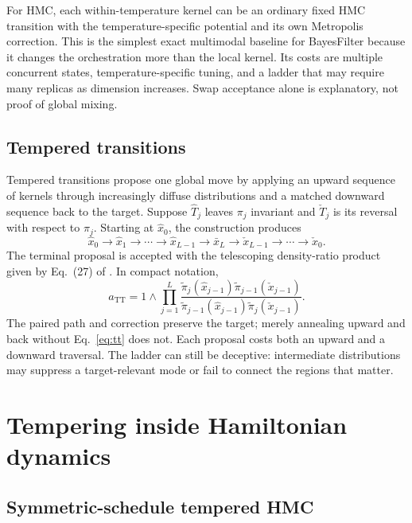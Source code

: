 \documentclass[11pt]{article}
\begin{document}
For HMC, each within-temperature kernel can be an ordinary fixed HMC transition
with the temperature-specific potential and its own Metropolis correction.  This is
the simplest exact multimodal baseline for BayesFilter because it changes the
orchestration more than the local kernel.  Its costs are multiple concurrent states,
temperature-specific tuning, and a ladder that may require many replicas as dimension
increases.  Swap acceptance alone is explanatory, not proof of global mixing.

\subsection{Tempered transitions}

Tempered transitions propose one global move by applying an upward sequence of
kernels through increasingly diffuse distributions and a matched downward sequence
back to the target.  Suppose $\widehat T_j$ leaves $\pi_j$ invariant and
$\check T_j$ is its reversal with respect to $\pi_j$.  Starting at
$\widehat x_0$, the construction produces
\begin{equation*}
 \widehat x_0\rightarrow\widehat x_1\rightarrow\cdots
 \rightarrow\widehat x_{L-1}\rightarrow\bar x_L
 \rightarrow\check x_{L-1}\rightarrow\cdots\rightarrow\check x_0.
\end{equation*}
The terminal proposal is accepted with the telescoping density-ratio product given
by Eq.~(27) of \citet{neal2001ais}.  In compact notation,
\begin{equation}
 a_{\mathrm{TT}}=1\wedge
 \prod_{j=1}^{L}
 \frac{\widetilde\pi_j(\widehat x_{j-1})
       \widetilde\pi_{j-1}(\check x_{j-1})}
      {\widetilde\pi_{j-1}(\widehat x_{j-1})
       \widetilde\pi_j(\check x_{j-1})}.
 \label{eq:tt}
\end{equation}
The paired path and correction preserve the target; merely annealing upward and
back without Eq.~\eqref{eq:tt} does not.  Each proposal costs both an upward and a
downward traversal.  The ladder can still be deceptive: intermediate distributions
may suppress a target-relevant mode or fail to connect the regions that matter.

\section{Tempering inside Hamiltonian dynamics}

\subsection{Symmetric-schedule tempered HMC}
\end{document}
